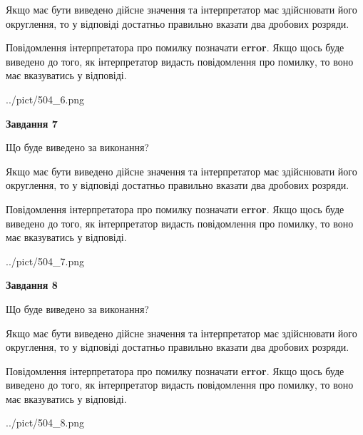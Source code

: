 \documentclass[12pt, ukrainian]{article}
\begin{document}
{\begin {Large}
Якщо має бути виведено дійсне значення та інтерпретатор має здійснювати його округлення, 
то у відповіді достатньо правильно вказати два дробових розряди.

Повідомлення інтерпретатора про помилку позначати \textbf{error}.
Якщо щось буде виведено до того, як інтерпретатор видасть повідомлення про помилку, 
то воно має вказуватись у відповіді. \par

\begin{center}
	{../pict/504_6.png}
\end{center}
\newpage

{\begin {center}\textbf{Завдання 7}\end {center}}\par
Що буде виведено за виконання? \par

Якщо має бути виведено дійсне значення та інтерпретатор має здійснювати його округлення, 
то у відповіді достатньо правильно вказати два дробових розряди.

Повідомлення інтерпретатора про помилку позначати \textbf{error}.
Якщо щось буде виведено до того, як інтерпретатор видасть повідомлення про помилку, 
то воно має вказуватись у відповіді. \par

\begin{center}
	{../pict/504_7.png}
\end{center}
\newpage

{\begin {center}\textbf{Завдання 8}\end {center}}\par
Що буде виведено за виконання? \par

Якщо має бути виведено дійсне значення та інтерпретатор має здійснювати його округлення, 
то у відповіді достатньо правильно вказати два дробових розряди.

Повідомлення інтерпретатора про помилку позначати \textbf{error}.
Якщо щось буде виведено до того, як інтерпретатор видасть повідомлення про помилку, 
то воно має вказуватись у відповіді. \par

\begin{center}
	{../pict/504_8.png}
\end{center}
\newpage


\end{Large}}
\end{document}
